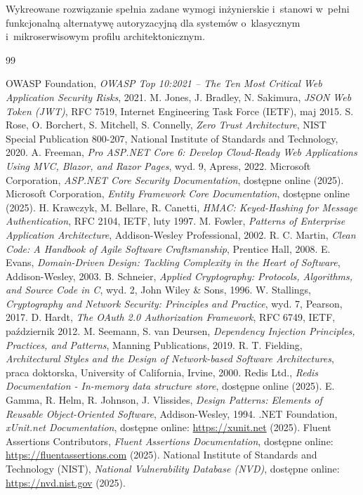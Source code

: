 \documentclass{SGGW-thesis}
\begin{document}
Wykreowane rozwiązanie spełnia zadane wymogi inżynierskie i~stanowi w~pełni funkcjonalną alternatywę autoryzacyjną dla systemów o~klasycznym i~mikroserwisowym profilu architektonicznym.

\clearpage

\begin{thebibliography}{99}

 OWASP Foundation, \textit{OWASP Top 10:2021 – The Ten Most Critical Web Application Security Risks}, 2021.
 M. Jones, J. Bradley, N. Sakimura, \textit{JSON Web Token (JWT)}, RFC 7519, Internet Engineering Task Force (IETF), maj 2015.
 S. Rose, O. Borchert, S. Mitchell, S. Connelly, \textit{Zero Trust Architecture}, NIST Special Publication 800-207, National Institute of Standards and Technology, 2020.
 A. Freeman, \textit{Pro ASP.NET Core 6: Develop Cloud-Ready Web Applications Using MVC, Blazor, and Razor Pages}, wyd. 9, Apress, 2022.
 Microsoft Corporation, \textit{ASP.NET Core Security Documentation}, dostępne online (2025).
 Microsoft Corporation, \textit{Entity Framework Core Documentation}, dostępne online (2025).
 H. Krawczyk, M. Bellare, R. Canetti, \textit{HMAC: Keyed-Hashing for Message Authentication}, RFC 2104, IETF, luty 1997.
 M. Fowler, \textit{Patterns of Enterprise Application Architecture}, Addison-Wesley Professional, 2002.
 R. C. Martin, \textit{Clean Code: A Handbook of Agile Software Craftsmanship}, Prentice Hall, 2008.
 E. Evans, \textit{Domain-Driven Design: Tackling Complexity in the Heart of Software}, Addison-Wesley, 2003.
 B. Schneier, \textit{Applied Cryptography: Protocols, Algorithms, and Source Code in C}, wyd. 2, John Wiley \& Sons, 1996.
 W. Stallings, \textit{Cryptography and Network Security: Principles and Practice}, wyd. 7, Pearson, 2017.
 D. Hardt, \textit{The OAuth 2.0 Authorization Framework}, RFC 6749, IETF, październik 2012.
 M. Seemann, S. van Deursen, \textit{Dependency Injection Principles, Practices, and Patterns}, Manning Publications, 2019.
 R. T. Fielding, \textit{Architectural Styles and the Design of Network-based Software Architectures}, praca doktorska, University of California, Irvine, 2000.
 Redis Ltd., \textit{Redis Documentation - In-memory data structure store}, dostępne online (2025).
 E. Gamma, R. Helm, R. Johnson, J. Vlissides, \textit{Design Patterns: Elements of Reusable Object-Oriented Software}, Addison-Wesley, 1994.
 .NET Foundation, \textit{xUnit.net Documentation}, dostępne online: \url{https://xunit.net} (2025).
 Fluent Assertions Contributors, \textit{Fluent Assertions Documentation}, dostępne online: \url{https://fluentassertions.com} (2025).
 National Institute of Standards and Technology (NIST), \textit{National Vulnerability Database (NVD)}, dostępne online: \url{https://nvd.nist.gov} (2025).

\end{thebibliography}

\beforelastpage
\end{document}
